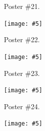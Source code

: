 \documentclass[12pt,oneside]{article}
\newcommand{\embed}[5]{\begin{center}\texttt{[image: \#5]}\end{center}\clearpage}
\newcommand{\onlyposter}[1]{\centerline{\small\noindent Poster \##1.}}
\begin{document}
\onlyposter{21}
\embed{2.5cm}{12cm}{1.8cm}{2.85cm}{51-ANNOgesic.pdf}

\onlyposter{22}
\embed{2.5cm}{3.25cm}{1cm}{2.8cm}{44-bioxsd.pdf}

\onlyposter{23}
\embed{2.5cm}{12cm}{2.25cm}{2.85cm}{60-mgkit.pdf}

\onlyposter{24}
\embed{2.5cm}{2.5cm}{0.25cm}{2.65cm}{64-annot-nf.pdf}

\end{document}
